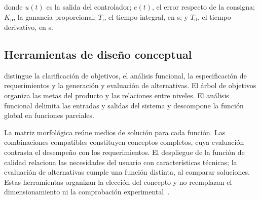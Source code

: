 \noindent donde $u(t)$ es la salida del controlador; $e(t)$, el error respecto de
la consigna; $K_{\mathrm{p}}$, la ganancia proporcional; $T_{\mathrm{i}}$, el
tiempo integral, en s; y $T_{\mathrm{d}}$, el tiempo derivativo, en s.

\subsection{Herramientas de diseño conceptual}
\label{subsec:fund_diseno_conceptual}

\textcite{cross2021design} distingue la clarificación de objetivos, el
análisis funcional, la especificación de requerimientos y la generación
y evaluación de alternativas. El árbol de objetivos organiza las metas
del producto y las relaciones entre niveles. El análisis funcional
delimita las entradas y salidas del sistema y descompone la función
global en funciones parciales.

La matriz morfológica reúne medios de solución para cada función. Las
combinaciones compatibles constituyen conceptos completos, cuya
evaluación contrasta el desempeño con los requerimientos. El despliegue
de la función de calidad relaciona las necesidades del usuario con
características técnicas; la evaluación de alternativas cumple una
función distinta, al comparar soluciones. Estas herramientas organizan
la elección del concepto y no reemplazan el dimensionamiento ni la
comprobación experimental~\parencite{cross2021design}.

%
